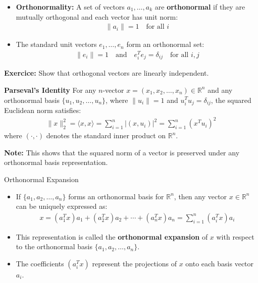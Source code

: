 \begin{frame}
    \begin{itemize}
        \item \textbf{Orthonormality:} A set of vectors  $a_1, \ldots, a_k$ are \textbf{orthonormal} if they are mutually orthogonal and each vector has unit norm:
        \begin{align}
            \|a_i\| = 1 \quad \text{for all } i
        \end{align}
        \item The standard unit vectors $e_1, \ldots, e_n$ form an orthonormal set:
        \begin{align}
            \|e_i\| = 1 \quad \text{and} \quad e_i^T e_j = \delta_{ij} \quad \text{for all } i, j
        \end{align}
    \end{itemize}
\end{frame}

\begin{frame}
    \textbf{Exercice:} Show that  orthogonal vectors are linearly independent.
\end{frame}

\begin{frame}
\begin{block}{\textbf{Parseval's Identity}}
    For any $n$-vector $x = (x_1, x_2, \ldots, x_n) \in \mathbb{R}^n$ and any orthonormal basis $\{u_1, u_2, \ldots, u_n\}$, where $\|u_i\| = 1$ and $u_i^T u_j = \delta_{ij}$, the squared Euclidean norm satisfies:
    \begin{align}
        \|x\|_2^2 = \langle x, x \rangle = \sum_{i=1}^n \vert ( x, u_i )\vert ^2 = \sum_{i=1}^n (x^T u_i)^2
    \end{align}
    where $( \cdot, \cdot )$ denotes the standard inner product on $\mathbb{R}^n$. 
\end{block}
\textbf{Note:} This shows that the squared norm of a vector is preserved under any orthonormal basis representation.
\end{frame}


\begin{frame}{Orthonormal Expansion}
\begin{itemize}
    \item If $\{a_1, a_2, \ldots, a_n\}$ forms an orthonormal basis for $\mathbb{R}^n$, then any vector $x \in \mathbb{R}^n$ can be uniquely expressed as:
    \begin{align}
        x = (a_1^T x)a_1 + (a_2^T x)a_2 + \cdots + (a_n^T x)a_n = \sum_{i=1}^n (a_i^T x)a_i \label{eq2,39}
    \end{align}
    \item This representation is called the \textbf{orthonormal expansion} of $x$ with respect to the orthonormal basis $\{a_1, a_2, \ldots, a_n\}$.
    \item The coefficients $(a_i^T x)$ represent the projections of $x$ onto each basis vector $a_i$.
\end{itemize}
\end{frame}

